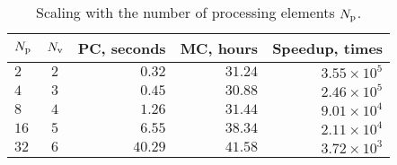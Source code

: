 \begin{table}
  \centering
  \caption{Scaling with the number of processing elements ${N_\text{p}}$.}
  \vspace{-10pt}
  \begin{tabular}{lcrrr}
    \toprule
    ${N_\text{p}}$ & ${N_\text{v}}$ & PC, seconds & MC, hours & Speedup, times \\
    \midrule
    $ 2$ & $2$ & $ 0.32$ & $31.24$ & $3.55 \times 10^5$ \\
    $ 4$ & $3$ & $ 0.45$ & $30.88$ & $2.46 \times 10^5$ \\
    $ 8$ & $4$ & $ 1.26$ & $31.44$ & $9.01 \times 10^4$ \\
    $16$ & $5$ & $ 6.55$ & $38.34$ & $2.11 \times 10^4$ \\
    $32$ & $6$ & $40.29$ & $41.58$ & $3.72 \times 10^3$ \\
    \bottomrule
  \end{tabular}
  \vspace{-10pt}
\end{table}
